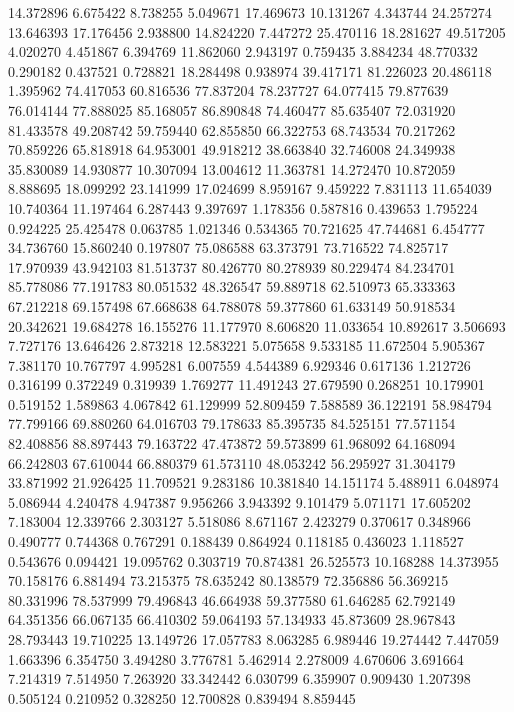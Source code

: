14.372896
6.675422
8.738255
5.049671
17.469673
10.131267
4.343744
24.257274
13.646393
17.176456
2.938800
14.824220
7.447272
25.470116
18.281627
49.517205
4.020270
4.451867
6.394769
11.862060
2.943197
0.759435
3.884234
48.770332
0.290182
0.437521
0.728821
18.284498
0.938974
39.417171
81.226023
20.486118
1.395962
74.417053
60.816536
77.837204
78.237727
64.077415
79.877639
76.014144
77.888025
85.168057
86.890848
74.460477
85.635407
72.031920
81.433578
49.208742
59.759440
62.855850
66.322753
68.743534
70.217262
70.859226
65.818918
64.953001
49.918212
38.663840
32.746008
24.349938
35.830089
14.930877
10.307094
13.004612
11.363781
14.272470
10.872059
8.888695
18.099292
23.141999
17.024699
8.959167
9.459222
7.831113
11.654039
10.740364
11.197464
6.287443
9.397697
1.178356
0.587816
0.439653
1.795224
0.924225
25.425478
0.063785
1.021346
0.534365
70.721625
47.744681
6.454777
34.736760
15.860240
0.197807
75.086588
63.373791
73.716522
74.825717
17.970939
43.942103
81.513737
80.426770
80.278939
80.229474
84.234701
85.778086
77.191783
80.051532
48.326547
59.889718
62.510973
65.333363
67.212218
69.157498
67.668638
64.788078
59.377860
61.633149
50.918534
20.342621
19.684278
16.155276
11.177970
8.606820
11.033654
10.892617
3.506693
7.727176
13.646426
2.873218
12.583221
5.075658
9.533185
11.672504
5.905367
7.381170
10.767797
4.995281
6.007559
4.544389
6.929346
0.617136
1.212726
0.316199
0.372249
0.319939
1.769277
11.491243
27.679590
0.268251
10.179901
0.519152
1.589863
4.067842
61.129999
52.809459
7.588589
36.122191
58.984794
77.799166
69.880260
64.016703
79.178633
85.395735
84.525151
77.571154
82.408856
88.897443
79.163722
47.473872
59.573899
61.968092
64.168094
66.242803
67.610044
66.880379
61.573110
48.053242
56.295927
31.304179
33.871992
21.926425
11.709521
9.283186
10.381840
14.151174
5.488911
6.048974
5.086944
4.240478
4.947387
9.956266
3.943392
9.101479
5.071171
17.605202
7.183004
12.339766
2.303127
5.518086
8.671167
2.423279
0.370617
0.348966
0.490777
0.744368
0.767291
0.188439
0.864924
0.118185
0.436023
1.118527
0.543676
0.094421
19.095762
0.303719
70.874381
26.525573
10.168288
14.373955
70.158176
6.881494
73.215375
78.635242
80.138579
72.356886
56.369215
80.331996
78.537999
79.496843
46.664938
59.377580
61.646285
62.792149
64.351356
66.067135
66.410302
59.064193
57.134933
45.873609
28.967843
28.793443
19.710225
13.149726
17.057783
8.063285
6.989446
19.274442
7.447059
1.663396
6.354750
3.494280
3.776781
5.462914
2.278009
4.670606
3.691664
7.214319
7.514950
7.263920
33.342442
6.030799
6.359907
0.909430
1.207398
0.505124
0.210952
0.328250
12.700828
0.839494
8.859445
